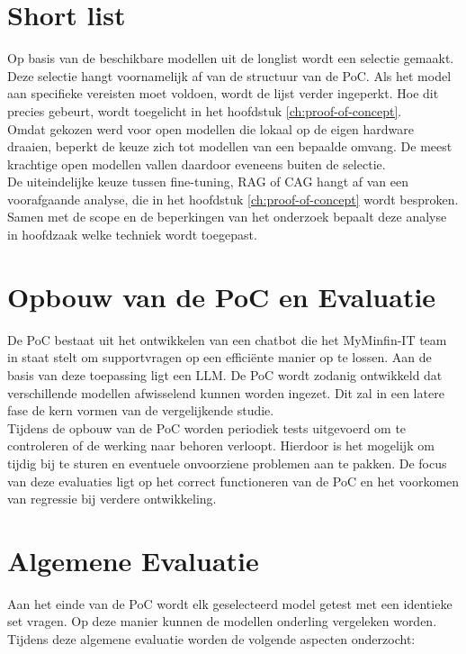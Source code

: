 \section{Short list}

Op basis van de beschikbare modellen uit de longlist wordt een selectie gemaakt. Deze selectie hangt voornamelijk af van de structuur van de PoC. Als het model aan specifieke vereisten moet voldoen, wordt de lijst verder ingeperkt. Hoe dit precies gebeurt, wordt toegelicht in het hoofdstuk \ref{ch:proof-of-concept}.
\\[1em]
Omdat gekozen werd voor open modellen die lokaal op de eigen hardware draaien, beperkt de keuze zich tot modellen van een bepaalde omvang. De meest krachtige open modellen vallen daardoor eveneens buiten de selectie.
\\[1em]
De uiteindelijke keuze tussen fine-tuning, RAG of CAG hangt af van een voorafgaande analyse, die in het hoofdstuk \ref{ch:proof-of-concept} wordt besproken. Samen met de scope en de beperkingen van het onderzoek bepaalt deze analyse in hoofdzaak welke techniek wordt toegepast.

\section{Opbouw van de PoC en Evaluatie}

De PoC bestaat uit het ontwikkelen van een chatbot die het MyMinfin-IT team in staat stelt om supportvragen op een efficiënte manier op te lossen. Aan de basis van deze toepassing ligt een LLM. De PoC wordt zodanig ontwikkeld dat verschillende modellen afwisselend kunnen worden ingezet. Dit zal in een latere fase de kern vormen van de vergelijkende studie.
\\[1em]
Tijdens de opbouw van de PoC worden periodiek tests uitgevoerd om te controleren of de werking naar behoren verloopt. Hierdoor is het mogelijk om tijdig bij te sturen en eventuele onvoorziene problemen aan te pakken. De focus van deze evaluaties ligt op het correct functioneren van de PoC en het voorkomen van regressie bij verdere ontwikkeling.

\section{Algemene Evaluatie}

Aan het einde van de PoC wordt elk geselecteerd model getest met een identieke set vragen. Op deze manier kunnen de modellen onderling vergeleken worden. Tijdens deze algemene evaluatie worden de volgende aspecten onderzocht:

